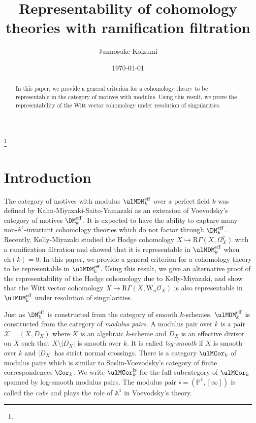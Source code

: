 \documentclass{amsart}
\theoremstyle{plain}
\theoremstyle{definition}
\theoremstyle{remark}
\numberwithin{equation}{section}
\newcommand{\bcube}{{\overline{\square}}}
\def\eff{\mathrm{eff}}
\def\ch{\mathrm{ch}}
\def\ls{\mathrm{ls}}
\begin{document}
\title{Representability of cohomology theories with ramification filtration}

\author[J. Koizumi]{Junnosuke Koizumi}
\address{Graduate School of Mathematical Sciences, University of Tokyo, 3-8-1 Komaba, Meguro-ku, Tokyo 153-8914, Japan}


\date{\today}
\thanks{}


\begin{abstract}
	In this paper, we provide a general criterion for a cohomology theory to be representable in the category of motives with modulus.
	Using this result, we prove the representability of the Witt vector cohomology under resolution of singularities.
\end{abstract}


\maketitle
\setcounter{tocdepth}{1}
\tableofcontents

\enlargethispage*{20pt}


\section{Introduction}

The category of motives with modulus $\ulMDM^\eff_k$ over a perfect field $k$ was defined by Kahn-Miyazaki-Saito-Yamazaki \cite{KMSY3} as an extension of Voevodsky's category of motives $\DM^\eff_k$.
It is expected to have the ability to capture many non-$\mathbb{A}^1$-invariant cohomology theories which do not factor through $\DM^\eff_k$.
Recently, Kelly-Miyazaki \cite{KellyMiyazaki_Hodge1} \cite{KellyMiyazaki_Hodge2} studied the Hodge cohomology $X\mapsto \mathrm{R}\Gamma(X,\Omega^q_X)$ with a ramification filtration and showed that it is representable in $\ulMDM^\eff_k$ when $\ch(k)=0$.
In this paper, we provide a general criterion for a cohomology theory to be representable in $\ulMDM^\eff_k$.
Using this result, we give an alternative proof of the representability of the Hodge cohomology due to Kelly-Miyazaki, and show that the Witt vector cohomology $X\mapsto \mathrm{R}\Gamma(X,\mathrm{W}_n\mathcal{O}_X)$ is also representable in $\ulMDM^\eff_k$ under resolution of singularities.

Just as $\DM^\eff_k$ is constructed from the category of smooth $k$-schemes, $\ulMDM^\eff_k$ is constructed from the category of \emph{modulus pairs}.
A modulus pair over $k$ is a pair $\mathcal{X}=(X,D_X)$ where $X$ is an algebraic $k$-scheme and $D_X$ is an effective divisor on $X$ such that $X\setminus|D_X|$ is smooth over $k$.
It is called \emph{log-smooth} if $X$ is smooth over $k$ and $|D_X|$ has strict normal crossings.
There is a category $\ulMCor_k$ of modulus pairs which is similar to Suslin-Voevodsky's category of finite correspondences $\Cor_k$.
We write $\ulMCor_k^\ls$ for the full subcategory of $\ulMCor_k$ spanned by log-smooth modulus pairs.
The modulus pair $\bcube=(\mathbb{P}^1,[\infty])$ is called the \emph{cube} and plays the role of $\mathbb{A}^1$ in Voevodsky's theory.
\end{document}

